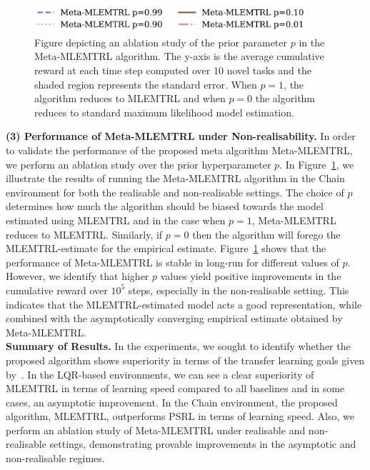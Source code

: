 \begin{figure}[t!]
\begin{minipage}{0.65\textwidth}
    \includegraphics[width=0.9\textwidth]{img/lqr_legend3.pdf}
    \caption{Figure depicting an ablation study of the prior parameter $p$ in the Meta-MLEMTRL algorithm. The y-axis is the average cumulative reward at each time step computed over $10$ novel tasks and the shaded region represents the standard error. When $p=1$, the algorithm reduces to MLEMTRL and when $p=0$ the algorithm reduces to standard maximum likelihood model estimation.}\label{fig:meta_results}
    \end{minipage}
\end{figure}

\noindent\textbf{(3) Performance of Meta-MLEMTRL under Non-realisability.} In order to validate the performance of the proposed meta algorithm Meta-MLEMTRL, we perform an ablation study over the prior hyperparameter $p$. In Figure~\ref{fig:meta_results}, we illustrate the results of running the Meta-MLEMTRL algorithm in the Chain environment for both the realisable and non-realisable settings. The choice of $p$ determines how much the algorithm should be biased towards the model estimated using MLEMTRL and in the case when $p=1$, Meta-MLEMTRL reduces to MLEMTRL. Similarly, if $p=0$ then the algorithm will forego the MLEMTRL-estimate for the empirical estimate. Figure~\ref{fig:meta_results} shows that the performance of Meta-MLEMTRL is stable in long-run for different values of $p$. %
However, we identify that higher $p$ values yield positive improvements in the cumulative reward over $10^5$ steps, especially in the non-realisable setting. This indicates that the MLEMTRL-estimated model acts a good representation, while combined with the asymptotically converging empirical estimate obtained by Meta-MLEMTRL.\\

\noindent\textbf{Summary of Results.} In the experiments, we sought to identify whether the proposed algorithm shows superiority in terms of the transfer learning goals given by~\citep{langley2006transfer}. In the LQR-based environments, we can see a clear superiority of MLEMTRL in terms of learning speed compared to all baselines and in some cases, an asymptotic improvement. In the Chain environment, the proposed algorithm, MLEMTRL, outperforms PSRL in terms of learning speed. Also, we perform an ablation study of Meta-MLEMTRL under realisable and non-realisable settings, demonstrating provable improvements in the asymptotic and non-realisable regimes.

